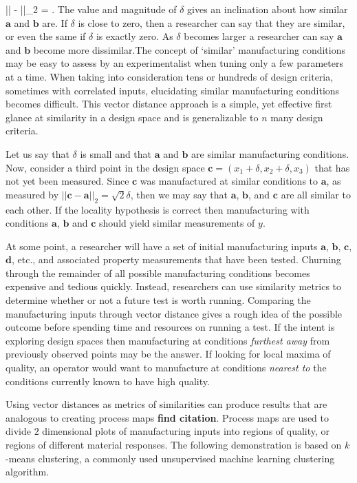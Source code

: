\eqn
||  - ||_2 = \delta.
\equ
The value and magnitude of $\delta$ gives an inclination about how similar $\mathbf{a}$ and $\mathbf{b}$ are. If $\delta$ is close to zero, then a researcher can say that they are similar, or even the same if $\delta$ is exactly zero. As $\delta$ becomes larger a researcher can say $\mathbf{a}$ and $\mathbf{b}$ become more dissimilar.The concept of `similar' manufacturing conditions may be easy to assess by an experimentalist when tuning only a few parameters at a time. When taking into consideration tens or hundreds of design criteria, sometimes with correlated inputs, elucidating similar manufacturing conditions becomes difficult. This vector distance approach is a simple, yet effective first glance at similarity in a design space and is generalizable to $n$ many design criteria. 

Let us say that $\delta$ is small and that $\mathbf{a}$ and $\mathbf{b}$ are similar manufacturing conditions. Now, consider a third point in the design space $\mathbf{c} = (x_{1} + \delta, x_2 + \delta, x_3)$ that has not yet been measured. Since $\mathbf{c}$ was manufactured at similar conditions to $\mathbf{a}$, as measured by $||\mathbf{c} - \mathbf{a}||_2 = \sqrt{2}\delta$, then we may say that $\mathbf{a}$, $\mathbf{b}$, and $\mathbf{c}$ are all similar to each other. If the locality hypothesis is correct then manufacturing with conditions $\mathbf{a}$, $\mathbf{b}$ and $\mathbf{c}$ should yield similar measurements of $y$. 

At some point, a researcher will have a set of initial manufacturing inputs $\mathbf{a}$, $\mathbf{b}$, $\mathbf{c}$, $\mathbf{d}$, etc., and associated property measurements that have been tested. Churning through the remainder of all possible manufacturing conditions becomes expensive and tedious quickly. Instead, researchers can use similarity metrics to determine whether or not a future test is worth running. Comparing the manufacturing inputs through vector distance gives a rough idea of the possible outcome before spending time and resources on running a test. If the intent is exploring design spaces then manufacturing at conditions \textit{furthest away} from previously observed points may be the answer. If looking for local maxima of quality, an operator would want to manufacture at conditions \textit{nearest to} the conditions currently known to have high quality. 

Using vector distances as metrics of similarities can produce results that are analogous to creating process maps \textbf{find citation}. Process maps are used to divide $2$ dimensional plots of manufacturing inputs into regions of quality, or regions of different material responses. The following demonstration is based on $k$-means clustering, a commonly used unsupervised machine learning clustering algorithm.

